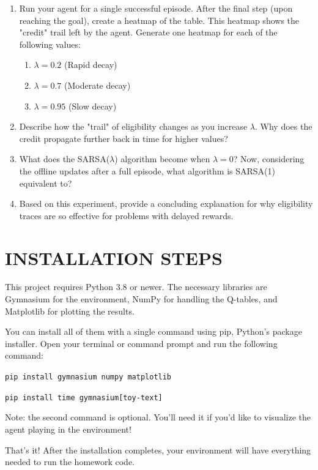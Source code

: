 \documentclass{article}
\begin{document}
\begin{enumerate}
    \item Run your agent for a single successful episode. After the final step (upon reaching the goal), create a heatmap of the table. This heatmap shows the "credit" trail left by the agent. Generate one heatmap for each of the following values:
    \begin{enumerate}[label=\alph*.]
        \item $\lambda = 0.2$ (Rapid decay)
        \item $\lambda = 0.7$ (Moderate decay)
        \item $\lambda = 0.95$ (Slow decay)
    \end{enumerate}
    
    
    \item Describe how the "trail" of eligibility changes as you increase $\lambda$. Why does the credit propagate further back in time for higher values?
    
    
    \item What does the SARSA($\lambda$) algorithm become when $\lambda = 0$? Now, considering the offline updates after a full episode, what algorithm is SARSA(1) equivalent to?
    
    
    \item Based on this experiment, provide a concluding explanation for why eligibility traces are so effective for problems with delayed rewards.
    
\end{enumerate}

\section{INSTALLATION STEPS}

This project requires Python 3.8 or newer. The necessary libraries are Gymnasium for the environment, NumPy for handling the Q-tables, and Matplotlib for plotting the results.

You can install all of them with a single command using pip, Python's package installer. Open your terminal or command prompt and run the following command:

\texttt{pip install gymnasium numpy matplotlib}

\texttt{pip install time gymnasium[toy-text]}

Note: the second command is optional. You’ll need it if you’d like to visualize the agent playing in the environment!

That's it! After the installation completes, your environment will have everything needed to run the homework code.
\end{document}
